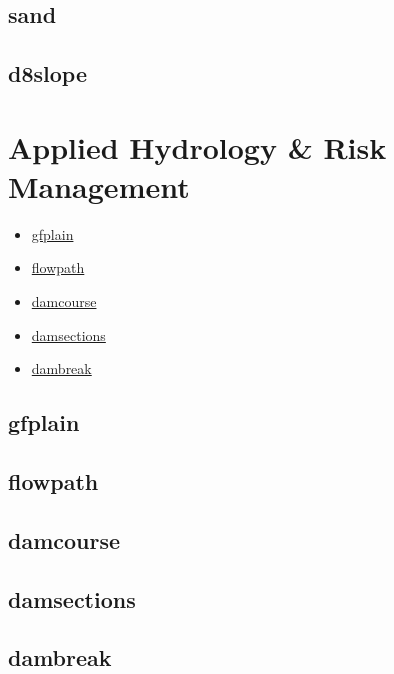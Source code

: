 \documentclass[
]{book}
\providecommand{\tightlist}{%
  \setlength{\itemsep}{0pt}\setlength{\parskip}{0pt}}
\theoremstyle{definition}
\theoremstyle{definition}
\theoremstyle{definition}
\theoremstyle{definition}
\theoremstyle{remark}
\begin{document}
\subsection{sand}\label{sand}

\subsection{d8slope}\label{d8slope}

\section{Applied Hydrology \& Risk Management}\label{Applied-Hydrology-Risk-Management}

\begin{itemize}
\tightlist
\item
  \hyperref[gfplain]{gfplain}\\
\item
  \hyperref[flowpath]{flowpath}\\
\item
  \hyperref[damcourse]{damcourse}\\
\item
  \hyperref[damsections]{damsections}\\
\item
  \hyperref[dambreak]{dambreak}
\end{itemize}

\subsection{gfplain}\label{gfplain}

\subsection{flowpath}\label{flowpath}

\subsection{damcourse}\label{damcourse}

\subsection{damsections}\label{damsections}

\subsection{dambreak}\label{dambreak}
\end{document}
